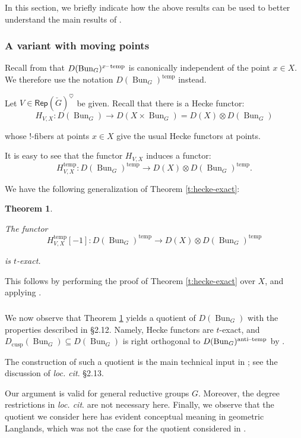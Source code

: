 \documentclass[reqno,11pt]{amsart}
\numberwithin{equation}{subsection}
\newtheorem{thm}{Theorem}[subsubsection]
\theoremstyle{remark}
\newcommand{\on}{\operatorname}
\newcommand{\mathendash}{\text{\textendash}}
\newcommand{\Rep}{\mathsf{Rep}}
\newcommand{\Bun}{\on{Bun}}
\newcommand{\heart}{\heartsuit}
\renewcommand{\subset}{\subseteq}
\newcommand{\temp}{\on{temp}}
\newcommand{\cusp}{\on{cusp}}
\newcommand{\at}{\on{anti}\!\mathendash\!\on{temp}}
\newcommand{\xtemp}{x\mathendash\on{temp}}
\begin{document}
In this section, we briefly indicate how the above results
can be used to better understand the main results of \cite{vanishing}.

\subsubsection{A variant with moving points}

Recall from \cite{independence} that $D(\Bun_G)^{\xtemp}$ is canonically
independent of the point $x \in X$. We therefore use the
notation $D(\Bun_G)^{\temp}$ instead.

Let $V \in \Rep(\check{G})^{\heart}$ be given. Recall that there
is a Hecke functor:
%
\[
H_{V,X}:D(\Bun_G) \to D(X \times \Bun_G) = D(X) \otimes D(\Bun_G)
\]

\noindent whose $!$-fibers at points $x \in X$ give the usual
Hecke functors at points.

It is easy to see that the functor $H_{V,X}$ induces a functor:
%
\[
H_{V,X}^{\temp}:D(\Bun_G)^{\temp} \to D(X) \otimes D(\Bun_G)^{\temp}.
\]

We have the following generalization of Theorem \ref{t:hecke-exact}:

\begin{thm}\label{t:hecke-exact-curve}

The functor
%
\[
H_{V,X}^{\temp}[-1]:D(\Bun_G)^{\temp} \to D(X) \otimes D(\Bun_G)^{\temp}
\]

\noindent is $t$-exact.

\end{thm}

This follows by performing the proof of Theorem \ref{t:hecke-exact} over
$X$, and applying \cite{independence}. 

\subsubsection{}

We now observe that Theorem \ref{t:hecke-exact-curve} yields
a quotient of $D(\Bun_G)$ with the properties described in 
\cite{vanishing} \S 2.12. Namely, Hecke functors are $t$-exact,
and $D_{\cusp}(\Bun_G) \subset D(\Bun_G)$ is right orthogonal 
to $D(\Bun_G)^{\at}$ by \cite{dario-ramanujan}.

The construction of such a quotient is the main technical input in 
\cite{vanishing}; see the discussion of \emph{loc. cit}. \S 2.13.

Our argument is valid for general reductive groups $G$. Moreover,
the degree restrictions in \emph{loc. cit}. are not necessary here.
Finally, we observe that the quotient we consider here has evident
conceptual meaning in geometric Langlands, which was not the case for
the quotient considered in \cite{vanishing}. 
\end{document}
